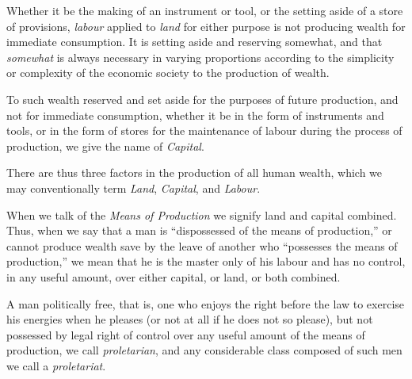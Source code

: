 \documentclass{book}
\begin{document}
Whether it be the making of an instrument or tool, or the setting aside of a store of provisions, \emph{labour} applied to \emph{land} for either purpose is not producing wealth for immediate consumption. It is setting aside and reserving somewhat, and that \emph{somewhat} is always necessary in varying proportions according to the simplicity or complexity of the economic society to the production of wealth.

To such wealth reserved and set aside for the purposes of future production, and not for immediate consumption, whether it be in the form of instruments and tools, or in the form of stores for the maintenance of labour during the process of production, we give the name of \emph{Capital}.

There are thus three factors in the production of all human wealth, which we may conventionally term \emph{Land}, \emph{Capital}, and \emph{Labour}.

When we talk of the \emph{Means of Production} we signify land and capital combined. Thus, when we say that a man is “dispossessed of the means of production,” or cannot produce wealth save by the leave of another who “possesses the means of production,” we mean that he is the master only of his labour and has no control, in any useful amount, over either capital, or land, or both combined.

A man politically free, that is, one who enjoys the right before the law to exercise his energies when he pleases (or not at all if he does not so please), but not possessed by legal right of control over any useful amount of the means of production, we call \emph{proletarian}, and any considerable class composed of such men we call a \emph{proletariat}.
\end{document}
